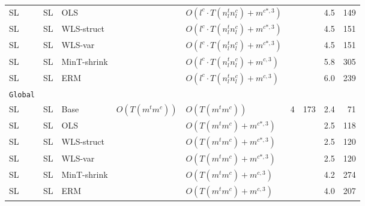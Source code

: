 \documentclass[preprint, 3p, times, twocolumn]{elsarticle}
\begin{document}
\begin{table}[t]
\begin{center}
{{\begin{tabular}{l l lllrrrr}
    \hspace{0.1cm} SL &SL &OLS &  &$O(l^c \cdot T(n^t_l n_l^c) + m^{c*,3})$  	&		&	&4.5	&149	\\
    \hspace{0.1cm} SL &SL &WLS-struct &  &$O(l^c \cdot T(n^t_ln_l^c) + m^{c*,3})$ &			&	&4.5	&151	\\
    \hspace{0.1cm} SL &SL &WLS-var &  &$O(l^c \cdot T(n^t_ln_l^c) + m^{c*,3})$		&	&	&4.5	&151	\\
    \hspace{0.1cm} SL &SL &MinT-shrink & &$O(l^c \cdot T(n^t_ln_l^c) + m^{c,3})$ &			&	&5.8	&305	\\
    \hspace{0.1cm} SL &SL &ERM &  &$O(l^c \cdot T(n^t_ln_l^c) + m^{c,3})$		&	&	&6.0	&239	\\
    \midrule 						
    \texttt{Global}  						\\
    \hspace{0.1cm} SL &SL &Base & \multirow{6}{*}{$O(T(m^tm^c))$} &$O(T(m^tm^c))$ 		&\multirow{6}{*}{4}	&\multirow{6}{*}{173}	&2.4	&71	\\
    \hspace{0.1cm} SL &SL &OLS &  &$O(T(m^tm^c) + m^{c*,3})$  		&	&	&2.5	&118	\\
    \hspace{0.1cm} SL &SL &WLS-struct &  &$O(T(m^tm^c) + m^{c*,3})$ 		&	&	&2.5	&120	\\
    \hspace{0.1cm} SL &SL &WLS-var &  &$O(T(m^tm^c) + m^{c*,3})$ 		&	&	&2.5	&120	\\
    \hspace{0.1cm} SL &SL &MinT-shrink &  &$O(T(m^tm^c) + m^{c,3})$		&	&	&4.2	&274	\\
    \hspace{0.1cm} SL &SL &ERM &  &$O(T(m^tm^c) + m^{c,3})$		&	&	&4.0	&207	\\
    \bottomrule				        
    \end{tabular}}}
    \end{center}
    \end{table}
  
\end{document}
